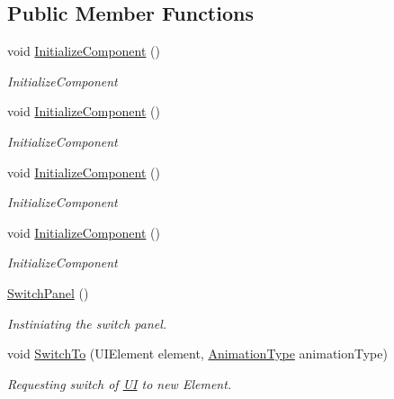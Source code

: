 \subsection*{Public Member Functions}
\begin{DoxyCompactItemize}
\item 
void \mbox{\hyperlink{class_wpf_handler_1_1_u_i_1_1_controls_1_1_switch_panel_a9a8e8f316052b03ca360d48a507e8734}{Initialize\+Component}} ()
\begin{DoxyCompactList}\small\item\em Initialize\+Component \end{DoxyCompactList}\item 
void \mbox{\hyperlink{class_wpf_handler_1_1_u_i_1_1_controls_1_1_switch_panel_a9a8e8f316052b03ca360d48a507e8734}{Initialize\+Component}} ()
\begin{DoxyCompactList}\small\item\em Initialize\+Component \end{DoxyCompactList}\item 
void \mbox{\hyperlink{class_wpf_handler_1_1_u_i_1_1_controls_1_1_switch_panel_a9a8e8f316052b03ca360d48a507e8734}{Initialize\+Component}} ()
\begin{DoxyCompactList}\small\item\em Initialize\+Component \end{DoxyCompactList}\item 
void \mbox{\hyperlink{class_wpf_handler_1_1_u_i_1_1_controls_1_1_switch_panel_a9a8e8f316052b03ca360d48a507e8734}{Initialize\+Component}} ()
\begin{DoxyCompactList}\small\item\em Initialize\+Component \end{DoxyCompactList}\item 
\mbox{\hyperlink{class_wpf_handler_1_1_u_i_1_1_controls_1_1_switch_panel_a66b597d71d605434b2f51276feff9c8b}{Switch\+Panel}} ()
\begin{DoxyCompactList}\small\item\em Instiniating the switch panel. \end{DoxyCompactList}\item 
void \mbox{\hyperlink{class_wpf_handler_1_1_u_i_1_1_controls_1_1_switch_panel_a324749b533fdd754c87f490379f49082}{Switch\+To}} (U\+I\+Element element, \mbox{\hyperlink{class_wpf_handler_1_1_u_i_1_1_controls_1_1_switch_panel_aad6e1d850ec0101cc8d98c259971e272}{Animation\+Type}} animation\+Type)
\begin{DoxyCompactList}\small\item\em Requesting switch of \mbox{\hyperlink{namespace_wpf_handler_1_1_u_i}{UI}} to new Element. \end{DoxyCompactList}\end{DoxyCompactItemize}
